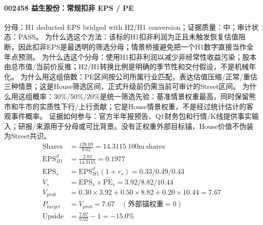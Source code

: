 \paragraph{002458 益生股份：常规扣非 EPS / PE}
分母：H1 deducted EPS bridged with H2/H1 conversion；证据质量：中；审计状态：PASS。
为什么选这个方法：该标的H1扣非利润为正且未触发恢复估值阻断，因此扣非EPS是最透明的筛选分母；情景桥接避免把一个H1数字直接当作全年点预测。
为什么选这个分母：使用H1扣非利润以减少非经常性收益污染；股本由总市值/当前价反推；H2/H1转换比例是明确的季节性和交付假设，不是机械年化。
为什么用这组倍数：PE区间按公司所属行业匹配，表达估值压缩/正常/重估三种情景；这是House筛选区间，正式升级前仍需当前可审计的Street区间。
为什么用这组概率：30\%/50\%/20\%是统一筛选先验：基准情景权重最高，同时保留熊市和牛市的实质性下行/上行贡献；它是House情景权重，不是经过统计估计的客观事件概率。
证据如何参与：官方半年报预告、Q1财务包和行情/K线提供事实输入；研报/来源用于分母或可比背景。没有正权重外部目标锚，House价值不伪装为Street共识。
\begin{align*}
\mathrm{Shares} &= \frac{129.09}{9.02}=14.3115\ \mathrm{100m\ shares}\\
\mathrm{EPS}_{H1}^d &= \frac{2.83}{14.3115}=0.1977\\
\mathrm{EPS}_s &= \mathrm{EPS}_{H1}^d(1+r_s)=0.33/0.49/0.43\\
V_s &= \mathrm{EPS}_s\times \mathrm{PE}_s=3.92/8.82/10.44\\
V_{prob} &= 0.30\times 3.92+0.50\times 8.82+0.20\times 10.44=7.67\\
P_{target} &= V_{prob}=7.67\quad(\text{外部锚权重}=0)\\
\mathrm{Upside} &= \frac{7.67}{9.02}-1=-15.0\%\\
\end{align*}

